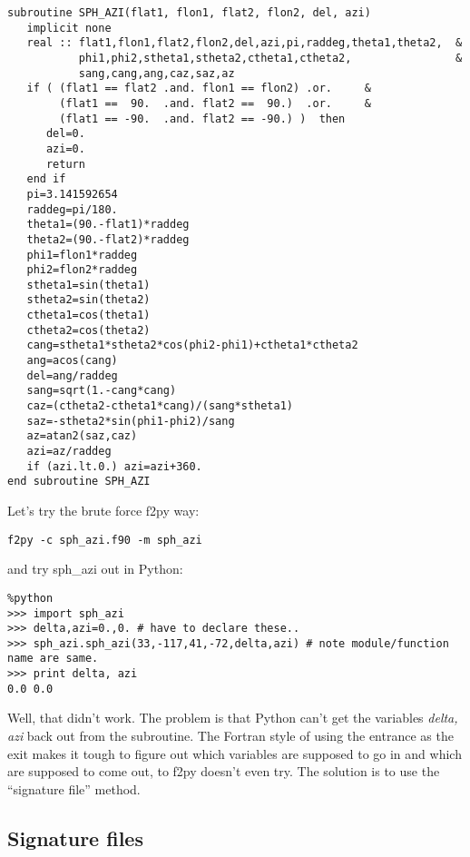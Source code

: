 {{\singlespacing \color{blue} \begin{verbatim}
subroutine SPH_AZI(flat1, flon1, flat2, flon2, del, azi)
   implicit none
   real :: flat1,flon1,flat2,flon2,del,azi,pi,raddeg,theta1,theta2,  &
           phi1,phi2,stheta1,stheta2,ctheta1,ctheta2,                &
           sang,cang,ang,caz,saz,az
   if ( (flat1 == flat2 .and. flon1 == flon2) .or.     &
        (flat1 ==  90.  .and. flat2 ==  90.)  .or.     &
        (flat1 == -90.  .and. flat2 == -90.) )  then
      del=0.
      azi=0.
      return
   end if
   pi=3.141592654
   raddeg=pi/180.
   theta1=(90.-flat1)*raddeg
   theta2=(90.-flat2)*raddeg
   phi1=flon1*raddeg
   phi2=flon2*raddeg
   stheta1=sin(theta1)
   stheta2=sin(theta2)
   ctheta1=cos(theta1)
   ctheta2=cos(theta2)
   cang=stheta1*stheta2*cos(phi2-phi1)+ctheta1*ctheta2
   ang=acos(cang)
   del=ang/raddeg
   sang=sqrt(1.-cang*cang)
   caz=(ctheta2-ctheta1*cang)/(sang*stheta1)
   saz=-stheta2*sin(phi1-phi2)/sang
   az=atan2(saz,caz)
   azi=az/raddeg
   if (azi.lt.0.) azi=azi+360.
end subroutine SPH_AZI
\end{verbatim}}

 
\noindent
 
Let's  try the brute force  {\color{blue}f2py} way:

{\singlespacing \color{blue} \begin{verbatim}
f2py -c sph_azi.f90 -m sph_azi
\end{verbatim}}

\noindent
and try {\color{blue} sph\_azi} out in Python:

{\singlespacing \color{blue} \begin{verbatim}
%python
>>> import sph_azi
>>> delta,azi=0.,0. # have to declare these..
>>> sph_azi.sph_azi(33,-117,41,-72,delta,azi) # note module/function name are same.
>>> print delta, azi
0.0 0.0
\end{verbatim}}



Well, that didn't work.  The problem is that   Python can't get the variables {\it delta, azi} back out from the subroutine.  The Fortran style of using the entrance as the exit makes it tough to figure out which variables are supposed to go in and which are supposed to come out, to {\color{blue}f2py} doesn't even try.  The solution is to use the ``signature file'' method. 

\subsection{Signature files}

}
